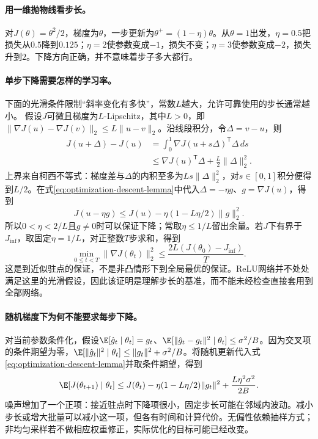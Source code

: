 \paragraph{用一维抛物线看步长。}
对$J(\theta)=\theta^2/2$，梯度为$\theta$，一步更新为$\theta^+=(1-\eta)\theta$。从$\theta=1$出发，$\eta=0.5$把损失从$0.5$降到$0.125$；$\eta=2$使参数变成$-1$，损失不变；$\eta=3$使参数变成$-2$，损失升到$2$。下降方向正确，并不意味着步子多大都行。

\paragraph{单步下降需要怎样的学习率。}
下面的光滑条件限制“斜率变化有多快”，常数$L$越大，允许可靠使用的步长通常越小。
假设$J$可微且梯度为$L$-Lipschitz，其中$L>0$，即$\|\nabla J(u)-\nabla J(v)\|_2\leq L\|u-v\|_2$。沿线段积分，令$\Delta=v-u$，则
\begin{align}
 J(u+\Delta)-J(u)
 &=\int_0^1\nabla J(u+s\Delta)^{\mathsf T}\Delta\,ds\\
 &\leq\nabla J(u)^{\mathsf T}\Delta+\frac L2\|\Delta\|_2^2.\label{eq:optimization-descent-lemma}
\end{align}
上界来自柯西不等式：梯度差与$\Delta$的内积至多为$Ls\|\Delta\|_2^2$，对$s\in[0,1]$积分便得到$L/2$。在式\eqref{eq:optimization-descent-lemma}中代入$\Delta=-\eta g$、$g=\nabla J(u)$，得到
\begin{equation}
 J(u-\eta g)\leq J(u)-\eta(1-L\eta/2)\|g\|_2^2.
\end{equation}
所以$0<\eta<2/L$且$g\ne0$时可以保证下降；常取$\eta\leq1/L$留出余量。若$J$下有界于$J_{\inf}$，取固定$\eta=1/L$，对正整数$T$步求和，得到
\begin{equation}
 \min_{0\leq t<T}\|\nabla J(\theta_t)\|_2^2
 \leq\frac{2L(J(\theta_0)-J_{\inf})}{T}.
\end{equation}
这是到近似驻点的保证，不是非凸情形下到全局最优的保证。ReLU网络并不处处满足这里的光滑假设，因此该证明是理解步长的基准，而不能未经检查直接套用到全部网络。

\paragraph{随机梯度下为何不能要求每步下降。}
对当前参数条件化，假设$\E[\hat g_t\mid\theta_t]=g_t$、$\E[\|\hat g_t-g_t\|^2\mid\theta_t]\leq\sigma^2/B$。因为交叉项的条件期望为零，$\E[\|\hat g_t\|^2\mid\theta_t]\leq\|g_t\|^2+\sigma^2/B$。将随机更新代入式\eqref{eq:optimization-descent-lemma}并取条件期望，得到
\begin{equation}
 \E[J(\theta_{t+1})\mid\theta_t]
 \leq J(\theta_t)-\eta(1-L\eta/2)\|g_t\|^2
       +\frac{L\eta^2\sigma^2}{2B}.
\end{equation}
噪声增加了一个正项：接近驻点时下降项很小，固定步长可能在邻域内波动。减小步长或增大批量可以减小这一项，但各有时间和计算代价。无偏性依赖抽样方式；非均匀采样若不做相应权重修正，实际优化的目标可能已经改变。

